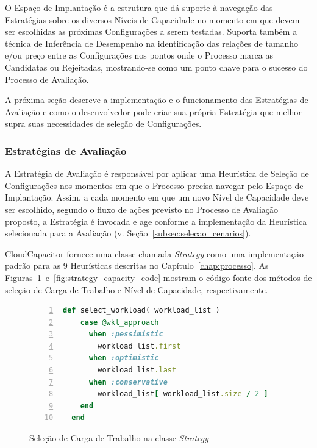 O Espaço de Implantação é a estrutura que dá suporte à navegação das Estratégias
sobre os diversos Níveis de Capacidade no momento em que devem ser escolhidas
as próximas Configurações a serem testadas. Suporta também a técnica de Inferência 
de Desempenho na identificação das relações de tamanho e/ou preço entre as 
Configurações nos pontos onde o Processo marca as Candidatas ou Rejeitadas, 
mostrando-se como um ponto chave para o sucesso do Processo de Avaliação.

A próxima seção descreve a implementação e o funcionamento das Estratégias de 
Avaliação e como o desenvolvedor pode criar sua própria Estratégia que melhor
supra suas necessidades de seleção de Configurações. 

\subsubsection{Estratégias de Avaliação}
\label{subsubsec:funcionamento_estrategias}
A Estratégia de Avaliação é responsável por aplicar uma Heurística de 
Seleção de Configurações nos momentos em que o Processo precisa navegar
pelo Espaço de Implantação. Assim, a cada momento em que um novo Nível 
de Capacidade deve ser escolhido, segundo o fluxo de ações previsto no 
Processo de Avaliação proposto, a Estratégia é invocada e age conforme 
a implementação da Heurística selecionada para a Avaliação 
(v. Seção~\ref{subsec:selecao_cenarios}).

CloudCapacitor fornece uma classe chamada \emph{Strategy} como uma implementação
padrão para as 9 Heurísticas descritas no Capítulo~\ref{chap:processo}. As
Figuras~\ref{fig:strategy_workload_code}~e~\ref{fig:strategy_capacity_code}
mostram o código fonte dos métodos de seleção de Carga de Trabalho e Nível
de Capacidade, respectivamente.

\begin{figure}[h]
  \caption{\label{fig:strategy_workload_code}Seleção de Carga de Trabalho na classe \emph{Strategy}}
  \begin{lstlisting}[language=Ruby,linewidth=\textwidth,xleftmargin=.04\textwidth, numbers=left]
  def select_workload( workload_list )
    case @wkl_approach
      when :pessimistic
        workload_list.first
      when :optimistic
        workload_list.last
      when :conservative
        workload_list[ workload_list.size / 2 ]
    end
  end
  \end{lstlisting}
\end{figure}

